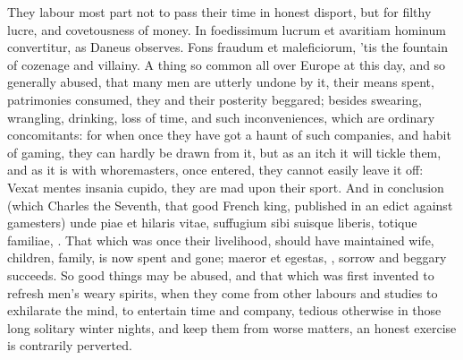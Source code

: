 {They labour most part not to pass their time in honest disport, but for
filthy lucre, and covetousness of money. In foedissimum lucrum et
avaritiam hominum convertitur, as Daneus observes. Fons fraudum et
maleficiorum, 'tis the fountain of cozenage and villainy. A thing
so common all over Europe at this day, and so generally abused, that
many men are utterly undone by it, their means spent, patrimonies
consumed, they and their posterity beggared; besides swearing,
wrangling, drinking, loss of time, and such inconveniences, which are
ordinary concomitants: for when once they have got a haunt of
such companies, and habit of gaming, they can hardly be drawn from it,
but as an itch it will tickle them, and as it is with whoremasters,
once entered, they cannot easily leave it off: Vexat mentes insania
cupido, they are mad upon their sport. And in conclusion (which Charles
the Seventh, that good French king, published in an edict against
gamesters) unde piae et hilaris vitae, suffugium sibi suisque liberis,
totique familiae, \etc{}. That which was once their livelihood, should have
maintained wife, children, family, is now spent and gone; maeror et
egestas, \etc{}, sorrow and beggary succeeds. So good things may be
abused, and that which was first invented to  refresh men's weary
spirits, when they come from other labours and studies to exhilarate
the mind, to entertain time and company, tedious otherwise in those
long solitary winter nights, and keep them from worse matters, an
honest exercise is contrarily perverted.

}
